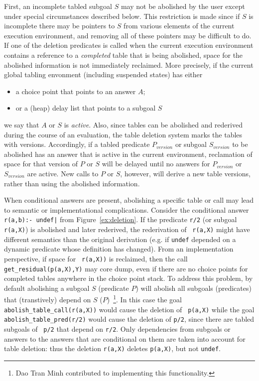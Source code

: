 \begin{description}
First, an incomplete tabled subgoal $S$ may not be abolished by the
user except under special circumstances described below.  This
restriction is made since if $S$ is incomplete there may be pointers
to $S$ from various elements of the current execution environment, and
removing all of these pointers may be difficult to do.  If one of the
deletion predicates is called when the current execution environment
contains a reference to a {\em completed} table that is being
abolished, space for the abolished information is not immediately
reclaimed.  More precisely, if the current global tabling envonment
(including suspended states) has either
\begin{itemize}
\item a choice point that points to an answer $A$; 
\item or a (heap) delay list that points to a subgoal $S$
\end{itemize}
we say that $A$ or $S$ is {\em active}.  Also, since tables can be
abolished and rederived during the course of an evaluation, the table
deletion system marks the tables with versions.  Accordingly, if a
tabled predicate $P_{version}$ or subgoal $S_{version}$ to be
abolished has an answer that is active in the current environment,
reclamation of space for that version of $P$ or $S$ will be delayed
until no answers for $P_{version}$ or $S_{version}$ are active.  New
calls to $P$ or $S$, however, will derive a new table versions, rather
than using the abolished information.

When conditional answers are present, abolishing a specific table or
call may lead to semantic or implementational complications.  Consider
the conditional answer {\tt r(a,b):- undef|} from
Figure~\ref{ex:deletion}.  If the predicate {\tt r/2} (or subgoal {\tt
  r(a,X)}) is abolished and later rederived, the rederivation of {\tt
  r(a,X)} might have different semantics than the original derivation
(e.g. if {\tt undef} depended on a dynamic predicate whose definition
has changed).  From an implementation perspective, if space for {\tt
  r(a,X))} is reclaimed, then the call {\tt get\_residual(p(a,X),Y)}
may core dump, even if there are no choice points for completed tables
anywhere in the choice point stack.  To address this problem, by
default abolishing a subgoal $S$ (predicate $P$) will abolish all
subgoals (predicates) that (transtively) depend on $S$
($P$)~\footnote{Dao Tran Minh contributed to implementing this
  functionality.}.  In this case the goal {\tt
  abolish\_table\_call(r(a,X))} would cause the deletion of {\tt
  p(a,X)} while the goal {\tt abolish\_table\_pred(r/2)} would cause
the deletion of {\tt p/2}, since there are tabled subgoals of {\tt
  p/2} that depend on {\tt r/2}.  Only dependencies from subgoals or
answers to the answers that are conditional on them are taken into
account for table deletion: thus the deletion {\tt r(a,X)} deletes
{\tt p(a,X)}, but not {\tt undef}.


\end{description}
